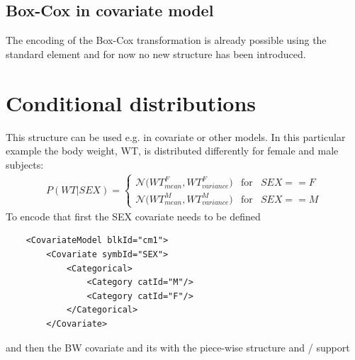 \subsection{Box-Cox in covariate model}
The encoding of the Box-Cox transformation is already possible using the
standard  element and for now no new structure has been introduced.


\section{Conditional distributions}
\label{sec:condDistros}
This structure can be used e.g. in covariate or other models. In this 
particular example the body weight, WT, is distributed differently for female and male subjects: 
\begin{align}
P(WT|SEX) = 
\left\{ \begin{array}{rcl}     
\mathcal N \big(WT^F_{mean}, WT^F_{variance}\big) & \mbox{for} & SEX == F \\  
\mathcal N \big(WT^M_{mean}, WT^M_{variance}\big) & \mbox{for} & SEX == M
\end{array}\right. \nonumber
\end{align}
To encode that first the SEX covariate needs to be defined 
\lstset{language=XML}
\begin{lstlisting}
    <CovariateModel blkId="cm1">
        <Covariate symbId="SEX">
            <Categorical>
                <Category catId="M"/>
                <Category catId="F"/>
            </Categorical>
        </Covariate>
\end{lstlisting}
and then the BW covariate and its  with the piece-wise
structure and / support
\lstset{language=XML}
